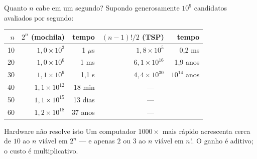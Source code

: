 \documentclass[aspectratio=169]{beamer}
\begin{document}
\begin{frame}{Quanto $n$ cabe em um segundo?}
  Supondo generosamente $10^9$ candidatos avaliados por segundo:

  \begin{center}
  \small
  \begin{tabular}{@{}rrrrr@{}}
    \toprule
    $n$ & $2^n$ (mochila) & tempo & $(n-1)!/2$ (TSP) & tempo \\
    \midrule
    10 & $1{,}0 \times 10^{3}$  & 1 $\mu$s   & $1{,}8 \times 10^{5}$  & 0{,}2 ms \\
    20 & $1{,}0 \times 10^{6}$  & 1 ms       & $6{,}1 \times 10^{16}$ & 1{,}9 anos \\
    30 & $1{,}1 \times 10^{9}$  & 1{,}1 s    & $4{,}4 \times 10^{30}$ & $10^{14}$ anos \\
    40 & $1{,}1 \times 10^{12}$ & 18 min     & \multicolumn{2}{c}{---} \\
    50 & $1{,}1 \times 10^{15}$ & 13 dias    & \multicolumn{2}{c}{---} \\
    60 & $1{,}2 \times 10^{18}$ & 37 anos    & \multicolumn{2}{c}{---} \\
    \bottomrule
  \end{tabular}
  \end{center}

  \begin{alertblock}{Hardware não resolve isto}
    Um computador $1000\times$ mais rápido acrescenta cerca de $10$ ao $n$ viável
    em $2^n$ --- e apenas $2$ ou $3$ ao $n$ viável em $n!$. O ganho é aditivo;
    o custo é multiplicativo.
  \end{alertblock}
\end{frame}
\end{document}
